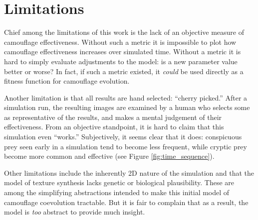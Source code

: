 \documentclass[acmtog]{acmart}
\begin{document}

\section{Limitations}
\label{subsec:limitations}
Chief among the limitations of this work is the lack of an objective measure of camouflage effectiveness. Without such a metric it is impossible to plot how camouflage effectiveness increases over simulated time. Without a metric it is hard to simply evaluate adjustments to the model: is a new parameter value better or worse? In fact, if such a metric existed, it \textit{could} be used directly as a fitness function for camouflage evolution.
\par
Another limitation is that all results are hand selected: “cherry picked.” After a simulation run, the resulting images are examined by a human who selects some as representative of the results, and makes a mental judgement of their effectiveness. From an objective standpoint, it is hard to claim that this simulation even “works.” Subjectively, it seems clear that it does: conspicuous prey seen early in a simulation tend to become less frequent, while cryptic prey become more common and effective (see Figure \ref{fig:time_sequence}).
\par
Other limitations include the inherently 2D nature of the simulation and that the model of texture synthesis lacks genetic or biological plausibility. These are among the simplifying abstractions intended to make this initial model of camouflage coevolution tractable. But it is fair to complain that as a result, the model is \textit{too} abstract to provide much insight.
\par

\end{document}
